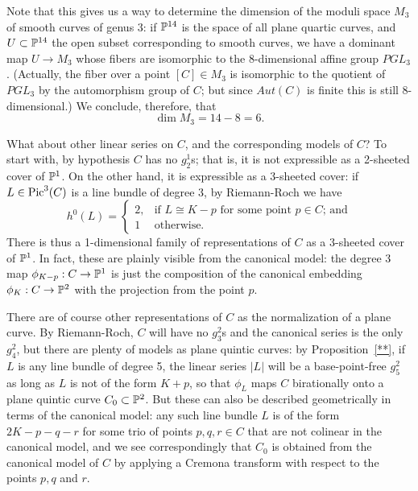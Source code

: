 Note that this gives us a way to determine the dimension of the moduli space $M_3$ of smooth curves of genus $3$: if $\PP^{14}$ is the space of all plane quartic curves, and $U \subset \PP^{14}$ the open subset corresponding to smooth curves, we have a dominant map $U \to M_3$ whose fibers are isomorphic to the 8-dimensional affine group $PGL_3$. (Actually, the fiber over a point $[C] \in M_3$ is isomorphic to the quotient of $PGL_3$ by the automorphism group of $C$; but since $Aut(C)$ is finite this is still 8-dimensional.) We conclude, therefore, that
$$
\dim M_3 = 14 - 8 = 6.
$$

%

What about other linear series on $C$, and the corresponding models of $C$? To start with, by hypothesis $C$ has no $g^1_2$s; that is, it is not expressible as a 2-sheeted cover of $\PP^1$. On the other hand, it is expressible as a 3-sheeted cover: if $L \in \pic^3(C)$ is a line bundle of degree 3, by Riemann-Roch we have
$$
h^0(L) = 
\begin{cases}
2, &\text{if $L \cong K-p$ for some point $p \in C$; and} \\
1 &\text{otherwise.}
\end{cases}
$$
There is thus a 1-dimensional family of representations of $C$ as a 3-sheeted cover of $\PP^1$. In fact, these are plainly visible from the canonical model: the degree 3 map $\phi_{K-p} : C \to \PP^1$ is just the composition of the canonical embedding $\phi_K : C \to \PP^2$ with the projection from the point $p$. 

There are of course other representations of $C$ as the normalization of a plane curve. By Riemann-Roch, $C$ will have no $g^2_3$s and the canonical series is the only $g^2_4$, but there are plenty of models as plane quintic curves: by Proposition~\ref{**}, if $L$ is any line bundle of degree 5, the linear series $|L|$ will be a base-point-free $g^2_5$ as long as $L$ is not of the form $K+p$, so that $\phi_L$ maps $C$ birationally onto a plane quintic curve $C_0 \subset \PP^2$. But these can also be described geometrically in terms of the canonical model: any such line bundle $L$ is of the form $2K-p-q-r$ for some trio of  points $p, q, r \in C$ that are not colinear in the canonical model, and we see correspondingly that $C_0$ is obtained from the canonical model of $C$ by applying a Cremona transform with respect to the points $p, q$ and $r$. 

